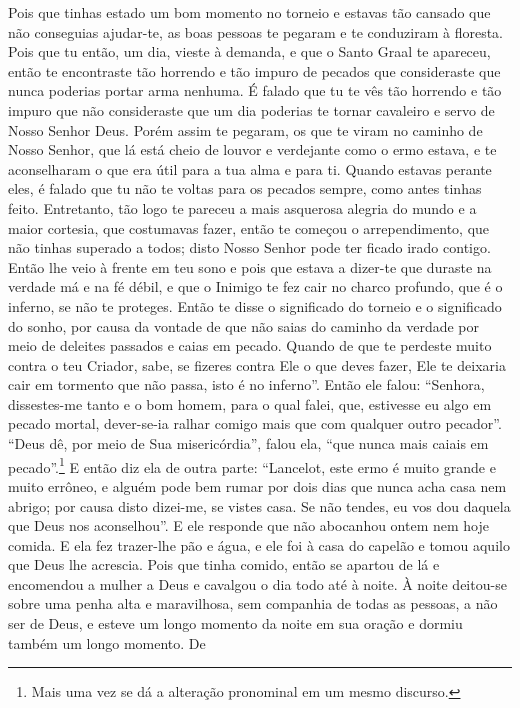 Pois que tinhas estado um bom momento no torneio e estavas tão cansado que não
conseguias ajudar-te, as boas pessoas te pegaram e te conduziram à floresta.
Pois que tu então, um dia, vieste à demanda, e que o Santo Graal te apareceu,
então te encontraste tão horrendo e tão impuro de pecados que consideraste que
nunca poderias portar arma nenhuma. É falado que tu te vês tão horrendo e tão
impuro que não consideraste que um dia poderias te tornar cavaleiro e servo de
Nosso Senhor Deus. Porém assim te pegaram, os que te viram no caminho de Nosso
Senhor, que lá está cheio de louvor e verdejante como o ermo estava, e te
aconselharam o que era útil para a tua alma e para ti. Quando estavas perante
eles, é falado que tu não te voltas para os pecados sempre, como antes tinhas
feito. Entretanto, tão logo te pareceu a mais asquerosa alegria do mundo e a
maior cortesia, que costumavas fazer, então te começou o arrependimento, que
não tinhas superado a todos; disto Nosso Senhor pode ter ficado irado contigo.
Então lhe veio à frente em teu sono e pois que estava a dizer-te que duraste na
verdade má e na fé débil, e que o Inimigo te fez cair no charco profundo, que é
o inferno, se não te proteges. Então te disse o significado do torneio e o
significado do sonho, por causa da vontade de que não saias do caminho da
verdade por meio de deleites passados e caias em pecado. Quando de que te
perdeste muito contra o teu Criador, sabe, se fizeres contra Ele o que deves
fazer, Ele te deixaria cair em tormento que não passa, isto é no inferno”. 
Então ele falou: “Senhora, dissestes-me tanto e o bom homem, para o
qual falei, que, estivesse eu algo em pecado mortal, dever-se-ia ralhar comigo
mais que com qualquer outro pecador”. “Deus dê, por meio de Sua misericórdia”,
falou ela, “que nunca mais caiais em pecado”.\footnote{ Mais uma vez se dá a
alteração pronominal em um mesmo discurso.} E então diz ela
de outra parte: “Lancelot, este ermo é muito grande e muito errôneo, e alguém
pode bem rumar por dois dias que nunca acha casa nem abrigo; por causa disto
dizei-me, se vistes casa. Se não tendes, eu vos dou daquela que Deus nos
aconselhou”. E ele responde que não abocanhou ontem nem hoje comida. E ela fez
trazer-lhe pão e água, e ele foi à casa do capelão e tomou aquilo que Deus lhe
acrescia. Pois que tinha comido, então se apartou de lá e encomendou a mulher a
Deus e cavalgou o dia todo até à noite. À noite deitou-se sobre uma penha alta
e maravilhosa, sem companhia de todas as pessoas, a não ser de Deus, e esteve
um longo momento da noite em sua oração e dormiu também um longo momento. De
